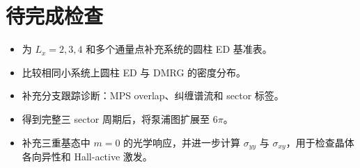 \documentclass[11pt]{article}
\begin{document}
\section{待完成检查}

\begin{itemize}
  \item 为 \(L_x=2,3,4\) 和多个通量点补充系统的圆柱 ED 基准表。
  \item 比较相同小系统上圆柱 ED 与 DMRG 的密度分布。
  \item 补充分支跟踪诊断：MPS overlap、纠缠谱流和 sector 标签。
  \item 得到完整三 sector 周期后，将泵浦图扩展至 \(6\pi\)。
  \item 补充三重基态中 \(m=0\) 的光学响应，并进一步计算
  \(\sigma_{yy}\) 与 \(\sigma_{xy}\)，用于检查晶体各向异性和 Hall-active 激发。
\end{itemize}
\end{document}
